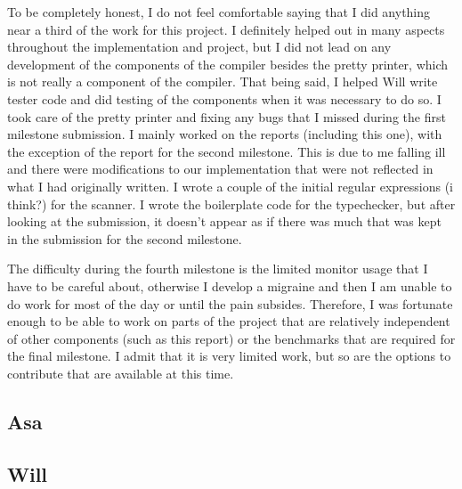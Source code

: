 \documentclass{article}
\begin{document}
To be completely honest, I do not feel comfortable saying that I did anything near a third of the work for this project. I definitely helped out in many aspects throughout the implementation and project, but I did not lead on any development of the components of the compiler besides the pretty printer, which is not really a component of the compiler. That being said, I helped Will write tester code and did testing of the components when it was necessary to do so. I took care of the pretty printer and fixing any bugs that I missed during the first milestone submission. I mainly worked on the reports (including this one), with the exception of the report for the second milestone. This is due to me falling ill and there were modifications to our implementation that were not reflected in what I had originally written. I wrote a couple of the initial regular expressions (i think?) for the scanner. I wrote the boilerplate code for the typechecker, but after looking at the submission, it doesn't appear as if there was much that was kept in the submission for the second milestone.

The difficulty during the fourth milestone is the limited monitor usage that I have to be careful about, otherwise I develop a migraine and then I am unable to do work for most of the day or until the pain subsides. Therefore, I was fortunate enough to be able to work on parts of the project that are relatively independent of other components (such as this report) or the benchmarks that are required for the final milestone. I admit that it is very limited work, but so are the options to contribute that are available at this time.


\subsection{Asa}


\subsection{Will}


\nocite{*}

{}

\end{document}
